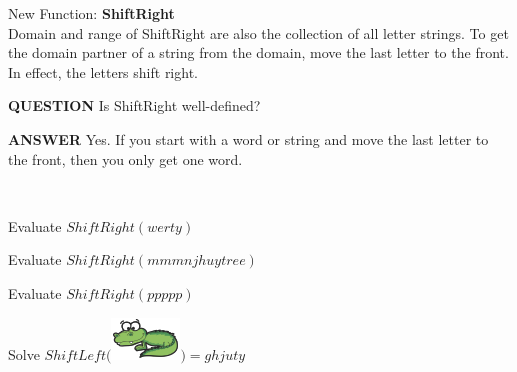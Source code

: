 \documentclass{ximera}
\begin{document}
\begin{exploration}

New Function: \textbf{ShiftRight} \\
Domain and range of ShiftRight are also the collection of all letter strings. To get the domain partner of a string from the domain, move the last letter to the front.  In effect, the letters shift right. \\


\begin{dialogue}
\item[\textbf{QUESTION}] Is ShiftRight well-defined?
\item[\textbf{ANSWER}] Yes. If you start with a word or string and move the last letter to the front, then you only get one word. 
\end{dialogue}
\quad \\


\begin{question}
Evaluate $ShiftRight(werty)$
\begin{multipleChoice}
\end{multipleChoice}
\end{question}



\begin{question}
Evaluate $ShiftRight(mmmnjhuytree)$
\begin{multipleChoice}
\end{multipleChoice}
\end{question}





\begin{question}
Evaluate $ShiftRight(ppppp)$
\begin{multipleChoice}
\end{multipleChoice}
\end{question}




\begin{question}
Solve $ShiftLeft($\includegraphics{pics/alligator.png}$) = ghjuty$
\begin{multipleChoice}
\end{multipleChoice}
\end{question}




\end{exploration}
\quad \\
\end{document}
